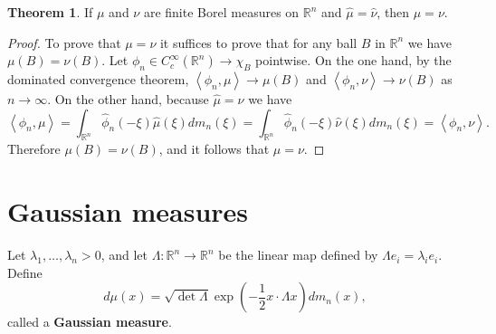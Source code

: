 \documentclass{article}
\newcommand{\inner}[2]{\left\langle #1, #2 \right\rangle}
\theoremstyle{definition}
\newtheorem{theorem}{Theorem}
\theoremstyle{definition}
\begin{document}
\begin{theorem}
If $\mu$ and $\nu$ are finite Borel  measures on $\mathbb{R}^n$ and $\hat{\mu}=\hat{\nu}$, then $\mu=\nu$.
\end{theorem}
\begin{proof}
To prove that $\mu=\nu$ it suffices to prove that for any ball $B$ in $\mathbb{R}^n$ we have $\mu(B)=\nu(B)$. 
Let $\phi_n \in C_c^\infty(\mathbb{R}^n) \to \chi_B$ pointwise.  On the one hand, by the dominated convergence theorem,
$\inner{\phi_n}{\mu} \to \mu(B)$ and  $\inner{\phi_n}{\nu} \to \nu(B)$ as $n \to \infty$.
On the other hand, because $\hat{\mu}=\hat{\nu}$ we have
\[
\inner{\phi_n}{\mu}=\int_{\mathbb{R}^n} \hat{\phi}_n(-\xi) \hat{\mu}(\xi) dm_n(\xi)
=\int_{\mathbb{R}^n} \hat{\phi}_n(-\xi) \hat{\nu}(\xi) dm_n(\xi)
=\inner{\phi_n}{\nu}.
\]
Therefore $\mu(B)=\nu(B)$, and it follows that $\mu=\nu$.
\end{proof}


\section{Gaussian measures}
Let $\lambda_1,\ldots,\lambda_n>0$, and let $\Lambda:\mathbb{R}^n \to \mathbb{R}^n$ be the linear map
defined by $\Lambda e_i=\lambda_i e_i$. Define 
\[
d\mu(x) = \sqrt{\det \Lambda} \exp\left(-\frac{1}{2} x\cdot \Lambda x \right) dm_n(x),
\]
called a \textbf{Gaussian measure}. 
\end{document}
